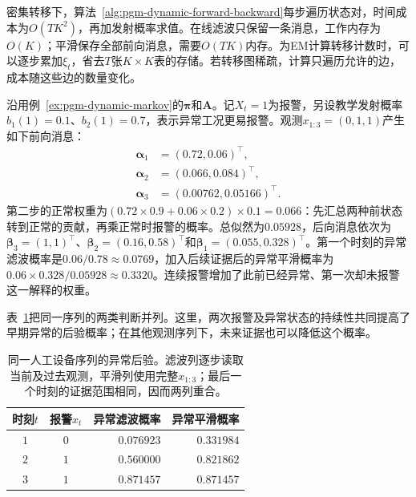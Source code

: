 密集转移下，算法~\ref{alg:pgm-dynamic-forward-backward}每步遍历状态对，时间成本为$O(TK^2)$，再加发射概率求值。在线滤波只保留一条消息，工作内存为$O(K)$；平滑保存全部前向消息，需要$O(TK)$内存。为EM计算转移计数时，可以逐步累加$\xi_t$，省去$T$张$K\times K$表的存储。若转移图稀疏，计算只遍历允许的边，成本随这些边的数量变化。

\begin{example}[报警证据怎样改变过去的判断]
  \label{ex:pgm-dynamic-hmm}
  沿用例~\ref{ex:pgm-dynamic-markov}的$\bm{\pi}$和$\bm{A}$。记$X_t=1$为报警，另设教学发射概率$b_1(1)=0.1$、$b_2(1)=0.7$，表示异常工况更易报警。观测$x_{1:3}=(0,1,1)$产生如下前向消息：
  \[
    \begin{aligned}
      \bm{\alpha}_1&=(0.72,0.06)^\top,\\
      \bm{\alpha}_2&=(0.066,0.084)^\top,\\
      \bm{\alpha}_3&=(0.00762,0.05166)^\top.
    \end{aligned}
  \]
  第二步的正常权重为$(0.72\times0.9+0.06\times0.2)\times0.1=0.066$：先汇总两种前状态转到正常的贡献，再乘正常时报警的概率。总似然为$0.05928$，后向消息依次为$\bm{\beta}_3=(1,1)^\top$、$\bm{\beta}_2=(0.16,0.58)^\top$和$\bm{\beta}_1=(0.055,0.328)^\top$。第一个时刻的异常滤波概率是$0.06/0.78\approx0.0769$，加入后续证据后的异常平滑概率为$0.06\times0.328/0.05928\approx0.3320$。连续报警增加了此前已经异常、第一次却未报警这一解释的权重。
\end{example}

表~\ref{tab:pgm-dynamic-hmm-example}把同一序列的两类判断并列。这里，两次报警及异常状态的持续性共同提高了早期异常的后验概率；在其他观测序列下，未来证据也可以降低这个概率。

\begin{table}[htbp]
  \centering
  \begin{tabular}{ccrr}
    \toprule
    时刻$t$ & 报警$x_t$ & 异常滤波概率 & 异常平滑概率 \\
    \midrule
    $1$ & $0$ & $0.076923$ & $0.331984$ \\
    $2$ & $1$ & $0.560000$ & $0.821862$ \\
    $3$ & $1$ & $0.871457$ & $0.871457$ \\
    \bottomrule
  \end{tabular}
  \caption{同一人工设备序列的异常后验。滤波列逐步读取当前及过去观测，平滑列使用完整$x_{1:3}$；最后一个时刻的证据范围相同，因而两列重合。}
  \label{tab:pgm-dynamic-hmm-example}
\end{table}

